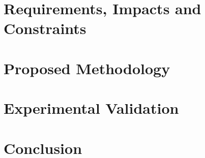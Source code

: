 \documentclass[12pt,oneside,openany]{report}
\begin{document}
\chapter{Requirements, Impacts and Constraints}



\chapter{Proposed Methodology}


% 

\chapter{Experimental Validation}


\chapter{Conclusion}



\printbibliography %

\begin{appendices} %
\newpage
{}
{}


\newpage
{}
{}

\end{appendices}
\end{document}
